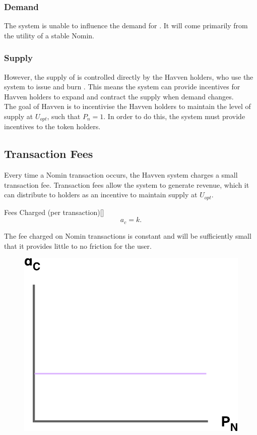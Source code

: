 \subsubsection*{Demand}

\noindent The system is unable to influence the demand for \NOM{}. It will come primarily from the utility of a stable Nomin.

\subsubsection*{Supply}

\noindent However, the supply of \NOM{} is controlled directly by the Havven holders, who use the system to issue and burn \NOM{}. This means the system can provide incentives for Havven holders to expand and contract the \NOM{} supply when demand changes. \\

\noindent The goal of Havven is to incentivise the Havven holders to maintain the level of \NOM{} supply at $U_{opt}$, such that $P_n = 1$. In order to do this, the system must provide incentives to the \HAV{} token holders.  \\

\newpage

\subsection{Transaction Fees} Every time a Nomin transaction occurs, the Havven system charges a small transaction fee. Transaction fees allow the system to generate revenue, which it can distribute to \HAV{} holders as an incentive to maintain \NOM{} supply at $U_{opt}$. \\

\begin{namedthm}{Fees Charged (per transaction)}[]
$$ a_c = k.$$
\end{namedthm}

\noindent The fee charged on Nomin transactions is constant and will be sufficiently small that it provides little to no friction for the user. \\

\begin{figure}[h!]
    \centering
    \includegraphics[width=.55\textwidth]{img/fees-charged}
\end{figure}

